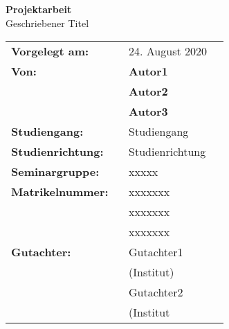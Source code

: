 
\begin{titlepage}
\begin{center}

\textbf{\Huge Projektarbeit}\\
\vspace{1.5cm}
\LARGE{Geschriebener Titel \\}
\vspace{1.5cm}
\end{center}
\begin{flushleft}
\large{
\begin{tabular}{l l r}
\vspace{1.0cm}
\textbf{Vorgelegt am:}\quad\quad\quad & 24. August 2020\\

\textbf{Von:}           ~ & \textbf{Autor1}\\
                        ~ & \textbf{Autor2}\\
\vspace{1.0cm}
                        ~ & \textbf{Autor3}\\

\textbf{Studiengang:}   ~ & Studiengang \\
\vspace{1.0cm}
\textbf{Studienrichtung:} ~ & Studienrichtung \\
\vspace{1.0cm}
\textbf{Seminargruppe:} ~ & xxxxx \\

\textbf{Matrikelnummer:} ~ & xxxxxxx \\
                         ~ & xxxxxxx \\
\vspace{1.0cm}
                         ~ & xxxxxxx \\
\textbf{Gutachter:}     ~ & Gutachter1 \\ ~ & (Institut)\\
                        ~ & Gutachter2 \\ ~ & (Institut\\
                        
\end{tabular}}
\end{flushleft}
\end{titlepage}
\newpage